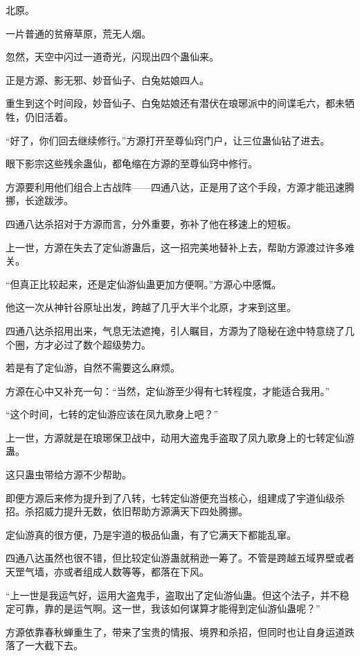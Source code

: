 
\begin{this_body}

北原。

一片普通的贫瘠草原，荒无人烟。

忽然，天空中闪过一道奇光，闪现出四个蛊仙来。

正是方源、影无邪、妙音仙子、白兔姑娘四人。

重生到这个时间段，妙音仙子、白兔姑娘还有潜伏在琅琊派中的间谍毛六，都未牺牲，仍旧活着。

“好了，你们回去继续修行。”方源打开至尊仙窍门户，让三位蛊仙钻了进去。

眼下影宗这些残余蛊仙，都龟缩在方源的至尊仙窍中修行。

方源要利用他们组合上古战阵——四通八达，正是用了这个手段，方源才能迅速腾挪，长途跋涉。

四通八达杀招对于方源而言，分外重要，弥补了他在移速上的短板。

上一世，方源在失去了定仙游蛊后，这一招完美地替补上去，帮助方源渡过许多难关。

“但真正比较起来，还是定仙游仙蛊更加方便啊。”方源心中感慨。

他这一次从神针谷原址出发，跨越了几乎大半个北原，才来到这里。

四通八达杀招用出来，气息无法遮掩，引人瞩目，方源为了隐秘在途中特意绕了几个圈，方才必过了数个超级势力。

若是有了定仙游，自然不需要这么麻烦。

方源在心中又补充一句：“当然，定仙游至少得有七转程度，才能适合我用。”

“这个时间，七转的定仙游应该在凤九歌身上吧？”

上一世，方源就是在琅琊保卫战中，动用大盗鬼手盗取了凤九歌身上的七转定仙游蛊。

这只蛊虫带给方源不少帮助。

即便方源后来修为提升到了八转，七转定仙游便充当核心，组建成了宇道仙级杀招。杀招威力提升无数，依旧帮助方源满天下四处腾挪。

定仙游真的很方便，乃是宇道的极品仙蛊，有了它满天下都能乱窜。

四通八达虽然也很不错，但比较定仙游蛊就稍逊一筹了。不管是跨越五域界壁或者天罡气墙，亦或者组成人数等等，都落在下风。

“上一世是我运气好，运用大盗鬼手，盗取出了定仙游仙蛊。但这个法子，并不稳定可靠，靠的是运气啊。这一世，我该如何谋算才能得到定仙游仙蛊呢？”

方源依靠春秋蝉重生了，带来了宝贵的情报、境界和杀招，但同时也让自身运道跌落了一大截下去。


\end{this_body}
